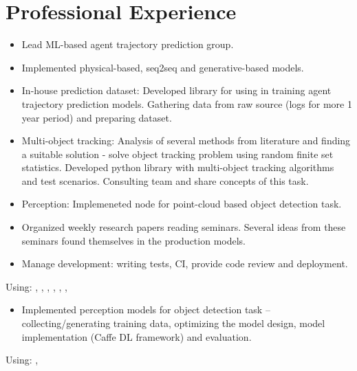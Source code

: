 \section*{\sectionformat Professional Experience}
% 
\begin{itemize}
    \item Lead ML-based agent trajectory prediction group.
    \item Implemented physical-based, seq2seq and generative-based models.
    \item In-house prediction dataset: Developed library for using in training agent trajectory prediction models. Gathering data from raw source (logs for more 1 year period) and preparing dataset.
    \item Multi-object tracking: Analysis of several methods from literature and finding a suitable solution - solve object tracking problem using random finite set statistics. Developed python library with multi-object tracking algorithms and test scenarios. Consulting team and share concepts of this task.
    \item Perception: Implemeneted node for point-cloud based object detection task.
    \item Organized weekly research papers reading seminars. Several ideas from these seminars found themselves in the production models.
    \item Manage development: writing tests, CI, provide code review and deployment.
\end{itemize}
Using: , , , , , , 
\horizontalline
% 
\begin{itemize}
    \item Implemented perception models for object detection task -- collecting/generating training data, optimizing the model design, model implementation (Caffe DL framework) and evaluation.
\end{itemize}
Using: , 


